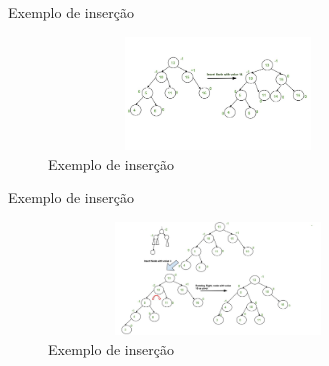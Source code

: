 \begin{frame}
	\begin{block}{Exemplo de inserção}
		\begin{figure}[!htb]
			\centering	  				
			\includegraphics[height=3cm, width = 9cm]{./pic/AVL_exemplo_04.jpg}
			\caption{Exemplo de inserção}
			\label{fig_pilha}
		\end{figure}
	\end{block}
\end{frame}

\begin{frame}
	\begin{block}{Exemplo de inserção}
		\begin{figure}[!htb]
			\centering	  				
			\includegraphics[height=3cm, width = 9cm]{./pic/AVL_exemplo_05.jpg}
			\caption{Exemplo de inserção}
			\label{fig_pilha}
		\end{figure}
	\end{block}
\end{frame}

